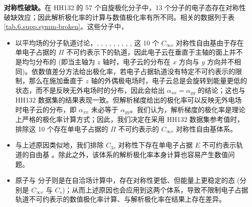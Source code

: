 \textbf{对称性破缺。}在 HH132 的 57 个自旋极化分子中，13 个分子的电子态存在对称性破缺效应；因此解析极化率的计算与数值极化率有所不同。相关的数据列于表 \ref{tab.6.supp.symm-broken}。这些分子中，
\begin{itemize}[nosep]
    \item 以平均场的分子轨道讨论，, , , , , , , , ,  这 10 个 $C_{\infty v}$ 对称性自由基由于存在单电子占据的 $\Pi$ 不可约表示下的轨道，因此电子云在垂直于主轴的面上并不是均匀分布的 (即当主轴为 $z$ 轴时，电子云的分布在 $x$ 方向与 $y$ 方向并不相同)。依数值差分方法给出极化率，若电子占据轨道没有特定不可约表示的限制，那么在施加垂直于 $z$ 轴的外偶极电场时，电子云总是会旋转到能量更低的状态，而不是反映无外电场时的分布，因此会给出 $\alpha_{xx} = \alpha_{yy}$ 的结论；这也与 HH132 数据集的结果表现一致。但解析梯度给出的极化率可以反映无外电场时电子云的分布，即 $\alpha_{xx}$ 未必等于 $\alpha_{yy}$。我们认为，解析梯度的极化率是理论上严格的极化率计算方式；因此，我们决定在采用 HH132 数据集参考值时，排除这 10 个存在单电子占据的  $\Pi$ 不可约表示的 $C_{\infty v}$ 对称性自由基体系。
    \item 与上述原因类似地，我们排除 $C_{3v}$ 对称性下存在单电子占据 $E$ 不可约表示轨道的自由基 。除此之外，该体系的解析极化率本身计算也容易产生数值问题。
    \item {} 原子与  分子则是在自洽场计算中，存在对称性更低、但能量上更稳定的态 (分别是 $C_{\infty v}$ 与 $C_s$)；从而上述原因也会应用到这两个体系，导致不限制电子占据轨道不可约表示的数值极化率计算、与解析极化率在结果上存在差异。
\end{itemize}

